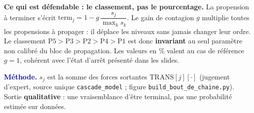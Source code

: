 \documentclass[11pt,a4paper]{article}
\begin{document}
\begin{cle}
\textbf{Ce qui est défendable : le classement, pas le pourcentage.} La propension à
terminer s'écrit $\text{term}_j = 1 - g\,\dfrac{s_j}{\max_k s_k}$. Le gain de contagion
$g$ multiplie toutes les propensions à propager : il déplace les niveaux sans jamais
changer leur ordre. Le classement $\text{P5} > \text{P3} > \text{P2} > \text{P4} >
\text{P1}$ est donc \textbf{invariant} au seul paramètre non calibré du bloc de
propagation. Les valeurs en \% valent au cas de référence $g=1$, cohérent avec l'état
d'arrêt présenté dans les slides.
\end{cle}

\smallskip
\noindent\footnotesize\textcolor{navy}{\textbf{Méthode.}} $s_j$ est la somme des forces
sortantes $\text{TRANS}[j][\cdot]$ (jugement d'expert, source unique
\texttt{cascade\_model} ; figure \texttt{build\_bout\_de\_chaine.py}). Sortie
\textbf{qualitative} : une vraisemblance d'être terminal, pas une probabilité estimée sur
données.
\end{document}
